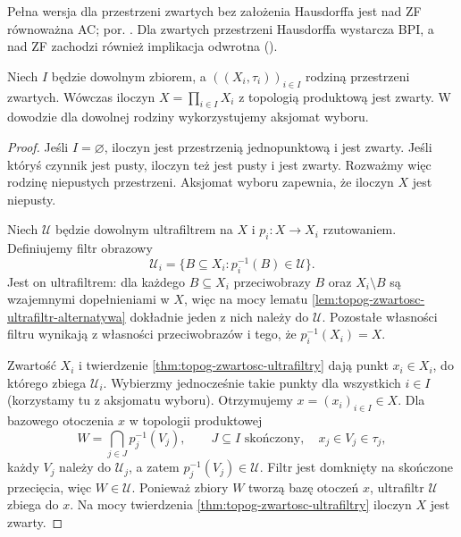 Pełna wersja dla przestrzeni zwartych bez założenia Hausdorffa jest nad ZF równoważna AC; por. . Dla zwartych przestrzeni Hausdorffa wystarcza BPI, a nad ZF zachodzi również implikacja odwrotna ().

\begin{twierdzenie}
\label{thm:topog-tychonoff-iloczyny}
Niech $I$ będzie dowolnym zbiorem, a
$((X_i,\tau_i))_{i\in I}$ rodziną przestrzeni
zwartych. Wówczas iloczyn
$X=\prod_{i\in I}X_i$ z topologią produktową
jest zwarty. W dowodzie dla dowolnej rodziny
wykorzystujemy aksjomat wyboru.
\end{twierdzenie}
\begin{proof}
Jeśli $I=\varnothing$, iloczyn jest przestrzenią
jednopunktową i jest zwarty. Jeśli któryś czynnik
jest pusty, iloczyn też jest pusty i jest zwarty.
Rozważmy więc rodzinę niepustych przestrzeni.
Aksjomat wyboru zapewnia, że iloczyn $X$ jest
niepusty.

Niech $\mathcal U$ będzie dowolnym ultrafiltrem
na $X$ i $p_i\colon X\to X_i$ rzutowaniem.
Definiujemy filtr obrazowy
\[
\mathcal U_i=\{B\subseteq X_i:
 p_i^{-1}(B)\in\mathcal U\}.
\]
Jest on ultrafiltrem: dla każdego $B\subseteq X_i$
przeciwobrazy $B$ oraz $X_i\setminus B$ są
wzajemnymi dopełnieniami w $X$, więc na mocy lematu
\ref{lem:topog-zwartosc-ultrafiltr-alternatywa}
dokładnie jeden z nich należy do $\mathcal U$.
Pozostałe własności filtru wynikają z własności
przeciwobrazów i tego, że $p_i^{-1}(X_i)=X$.

Zwartość $X_i$ i twierdzenie
\ref{thm:topog-zwartosc-ultrafiltry} dają punkt
$x_i\in X_i$, do którego zbiega $\mathcal U_i$.
Wybierzmy jednocześnie takie punkty dla wszystkich
$i\in I$ (korzystamy tu z aksjomatu wyboru).
Otrzymujemy $x=(x_i)_{i\in I}\in X$.
Dla bazowego otoczenia $x$ w topologii produktowej
\[
W=\bigcap_{j\in J}p_j^{-1}(V_j),\qquad J\subseteq I
\text{ skończony},\quad x_j\in V_j\in\tau_j,
\]
każdy $V_j$ należy do $\mathcal U_j$, a zatem
$p_j^{-1}(V_j)\in\mathcal U$.
Filtr jest domknięty na skończone przecięcia,
więc $W\in\mathcal U$.
Ponieważ zbiory $W$ tworzą bazę otoczeń $x$,
ultrafiltr $\mathcal U$ zbiega do $x$.
Na mocy twierdzenia \ref{thm:topog-zwartosc-ultrafiltry}
iloczyn $X$ jest zwarty.
\end{proof}

